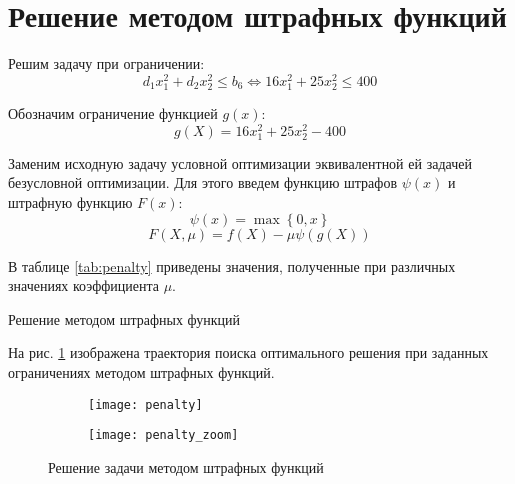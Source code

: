 \section{Решение методом штрафных функций}

Решим задачу при ограничении:
\begin{equation*}
d_1 x_1^2 + d_2 x_2^2 \leq b_6
\Longleftrightarrow
16 x_1^2 + 25 x_2^2 \leq 400
\end{equation*}

Обозначим ограничение функцией $g(x)$:
\begin{equation*}
g(X) = 16 x_1^2 + 25 x_2^2 - 400
\end{equation*}

Заменим исходную задачу условной оптимизации эквивалентной ей задачей безусловной оптимизации. Для этого введем функцию штрафов $\psi(x)$ и штрафную функцию $F(x)$:
\begin{equation*}
\psi(x) = \max \left\{ 0, x \right\}
\end{equation*}
\begin{equation*}
F(X, \mu) = f(X) - \mu \psi(g(X))
\end{equation*}

В таблице \ref{tab:penalty} приведены значения, полученные при различных значениях коэффициента $\mu$.
\begin{table}[H]
\begin{center}
	   \caption{Решение методом штрафных функций}
	   \label{tab:penalty}
\end{center}
\end{table}

На рис. \ref{fig:penalty} изображена траектория поиска оптимального решения при заданных ограничениях методом штрафных функций.
\vspace{-0.5cm}
\begin{figure}[H]
\begin{center}
	\begin{subfigure}[b]{0.49\textwidth}
		\texttt{[image: penalty]}
	\end{subfigure}
	\begin{subfigure}[b]{0.49\textwidth}
		\texttt{[image: penalty\_zoom]}
	\end{subfigure}
	\caption{Решение задачи методом штрафных функций}
	\label{fig:penalty}
\end{center}
\end{figure}

